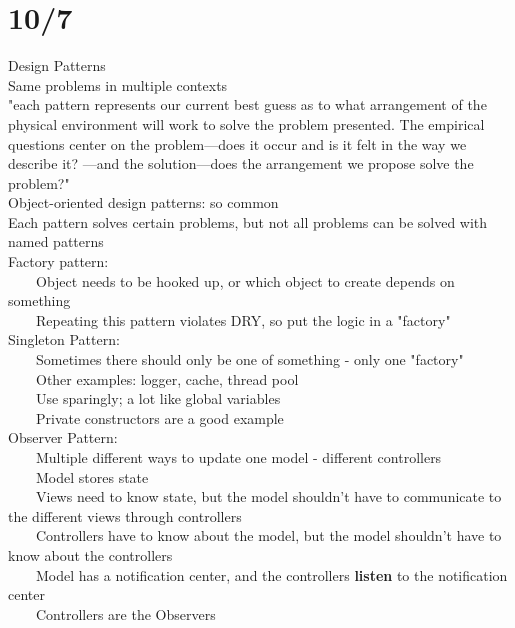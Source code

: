 \documentclass[10pt,letterpaper,unboxed,cm]{article}
\newcommand{\tab}{~~~~}
\begin{document}
\section{10/7}
Design Patterns\\
Same problems in multiple contexts\\
"each pattern represents our current best guess as to what arrangement of the physical environment will work to solve the problem presented. The empirical
questions center on the problem---does it occur and is it felt in the way we describe it? ---and the solution---does the arrangement we propose solve the problem?"\\
Object-oriented design patterns: so common\\
Each pattern solves certain problems, but not all problems can be solved with named patterns\\
Factory pattern: \\
\tab Object needs to be hooked up, or which object to create depends on something\\
\tab Repeating this pattern violates DRY, so put the logic in a "factory"\\
Singleton Pattern:\\
\tab Sometimes there should only be one of something - only one "factory"\\
\tab Other examples: logger, cache, thread pool\\
\tab Use sparingly; a lot like global variables\\
\tab Private constructors are a good example\\
Observer Pattern:\\
\tab Multiple different ways to update one model - different controllers\\
\tab Model stores state\\
\tab Views need to know state, but the model shouldn't have to communicate to the different views through controllers\\
\tab Controllers have to know about the model, but the model shouldn't have to know about the controllers\\
\tab Model has a notification center, and the controllers \textbf{listen} to the notification center\\
\tab Controllers are the Observers
\end{document}
